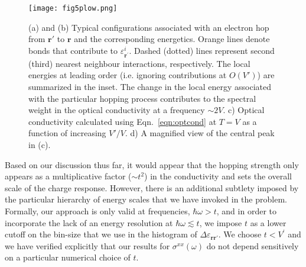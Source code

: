 \documentclass[aps,prx,onecolumn,amsmath,nofootinbib,amssymb,11pt]{revtex4-1}
\renewcommand{\vec}[1]{\boldsymbol{#1}}
\def \r {{\vec r}}
\begin{document}
{\begin{figure}
\centering
\texttt{[image: fig5plow.png]}
\caption{\textsf{(a) and (b) Typical configurations associated with an electron hop  from $\r'$ to $\r$ and the corresponding energetics. Orange lines denote bonds that contribute to $\varepsilon_{\r^\prime}^{i}$. Dashed (dotted) lines represent second (third) nearest neighbour interactions, respectively. The local energies at leading order (i.e. ignoring contributions at $O(V')$) are summarized in the inset.
        The change in the local energy associated with the particular hopping process contributes to the spectral weight in the optical conductivity at a frequency $\sim 2V$. c) Optical conductivity calculated using Eqn.~\ref{eqn:optcond} at $T=V$ as a function of increasing $V'/V$. d) A magnified view of the central peak in (c).}}
        \label{fig:optfig}%
\end{figure} 


Based on our discussion thus far, it would appear that the hopping strength only appears as a multiplicative factor ($\sim t^2$) in the conductivity and sets the overall scale of the charge response. However, there is an additional subtlety imposed by the particular hierarchy of energy scales that we have invoked in the problem. Formally, our approach is only valid at frequencies, $\hbar \omega > t$, and in order to incorporate the lack of an energy resolution at  $\hbar \omega \lesssim t$, we impose $t$ as a lower cutoff on the bin-size that we use in the histogram of $ \Delta  \varepsilon_{\r\r'}$. We choose $t<V^{\prime}$ and we have verified explicitly that our results for $\sigma^{xx}(\omega)$ do not depend sensitively on a particular numerical choice of $t$. 


}
\end{document}
